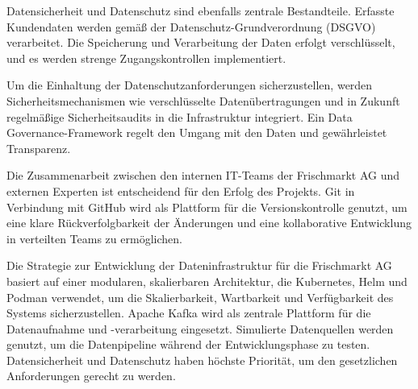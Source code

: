 \documentclass[%
pdftex,
oneside,			%
11pt,				%
parskip=half,		%
headheight = 12pt,	%
headsepline,		%
footsepline,		%
footheight = 16pt,	%
abstracton,		%
DIV=calc,		%
BCOR=8mm,		%
headinclude=false,	%
footinclude=false,	%
listof=totoc,		%
toc=bibliography,	%
]{scrreprt}	%
\begin{document}

    Datensicherheit und Datenschutz sind ebenfalls zentrale Bestandteile.
    Erfasste Kundendaten werden gemäß der Datenschutz-Grundverordnung (DSGVO) verarbeitet.
    Die Speicherung und Verarbeitung der Daten erfolgt verschlüsselt, und es werden strenge Zugangskontrollen implementiert.

    Um die Einhaltung der Datenschutzanforderungen sicherzustellen, werden Sicherheitsmechanismen wie verschlüsselte Datenübertragungen und in Zukunft regelmäßige Sicherheitsaudits in die Infrastruktur integriert.
    Ein Data Governance-Framework regelt den Umgang mit den Daten und gewährleistet Transparenz.


    Die Zusammenarbeit zwischen den internen IT-Teams der Frischmarkt AG und externen Experten ist entscheidend für den Erfolg des Projekts.
    Git in Verbindung mit GitHub wird als Plattform für die Versionskontrolle genutzt, um eine klare Rückverfolgbarkeit der Änderungen und eine kollaborative Entwicklung in verteilten Teams zu ermöglichen.


    Die Strategie zur Entwicklung der Dateninfrastruktur für die Frischmarkt AG basiert auf einer modularen, skalierbaren Architektur, die Kubernetes, Helm und Podman verwendet, um die Skalierbarkeit, Wartbarkeit und Verfügbarkeit des Systems sicherzustellen.
    Apache Kafka wird als zentrale Plattform für die Datenaufnahme und -verarbeitung eingesetzt.
    Simulierte Datenquellen werden genutzt, um die Datenpipeline während der Entwicklungsphase zu testen.
    Datensicherheit und Datenschutz haben höchste Priorität, um den gesetzlichen Anforderungen gerecht zu werden.


\end{document}

